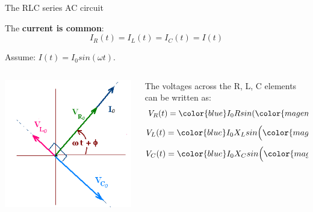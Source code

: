 %
%
%

\begin{frame}{The RLC series AC circuit}


The {\bf current is common}:
\begin{equation*}
    I_R(t) =  I_L(t) = I_C(t) = I(t)
\end{equation*}

\vspace{0.2cm}
Assume: $\displaystyle I(t) = I_0 sin(\omega t)$.\\

\begin{columns}
  \begin{column}{0.40\textwidth}
    \begin{center}
        \includegraphics[width=0.99\textwidth]{./images/schematics/ac_rlc_phasor_diagram_01.png}\\
     \end{center}
  \end{column}
  \begin{column}{0.60\textwidth}
      The voltages across the R, L, C elements can be written as:
      \begin{equation*}
          V_R(t) = {\color{blue} I_0 R} sin({\color{magenta} \omega t}); \;\;
      \end{equation*}
      \begin{equation*}
          V_L(t) = {\color{blue} I_0 X_L} sin\Big({\color{magenta} \omega t + \frac{\pi}{2} } \Big); \;\;
      \end{equation*}
      \begin{equation*}
          V_C(t) = {\color{blue} I_0 X_C} sin\Big({\color{magenta} \omega t - \frac{\pi}{2} } \Big)
      \end{equation*}
  \end{column}
\end{columns}

\end{frame}

